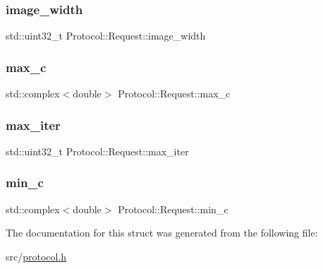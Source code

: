 \subsubsection{\texorpdfstring{image\+\_\+width}{image\_width}}
{\footnotesize\ttfamily std\+::uint32\+\_\+t Protocol\+::\+Request\+::image\+\_\+width}

\mbox{\label{structProtocol_1_1Request_a65b9e26893f8ab218ded9bf88f7b7003}} 
\subsubsection{\texorpdfstring{max\+\_\+c}{max\_c}}
{\footnotesize\ttfamily std\+::complex$<$double$>$ Protocol\+::\+Request\+::max\+\_\+c}

\mbox{\label{structProtocol_1_1Request_a1ab4bee193a4599f5db9281fa41f31e2}} 
\subsubsection{\texorpdfstring{max\+\_\+iter}{max\_iter}}
{\footnotesize\ttfamily std\+::uint32\+\_\+t Protocol\+::\+Request\+::max\+\_\+iter}

\mbox{\label{structProtocol_1_1Request_a4a4739df28bbb9a1252dedeb5f918db8}} 
\subsubsection{\texorpdfstring{min\+\_\+c}{min\_c}}
{\footnotesize\ttfamily std\+::complex$<$double$>$ Protocol\+::\+Request\+::min\+\_\+c}



The documentation for this struct was generated from the following file\+:\begin{DoxyCompactItemize}
\item 
src/\hyperlink{protocol_8h}{protocol.\+h}\end{DoxyCompactItemize}
